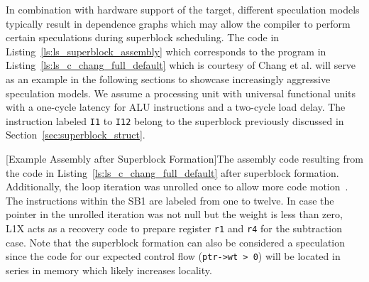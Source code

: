  In combination with hardware support of the target, different speculation models typically result in dependence graphs which may allow the compiler to perform certain speculations during superblock scheduling. The code in Listing~\ref{ls:ls_superblock_assembly} which corresponds to the program in Listing~\ref{ls:ls_c_chang_full_default} which is courtesy of Chang et al. will serve as an example in the following sections to showcase increasingly aggressive speculation models. We assume a processing unit with universal functional units with a one-cycle latency for ALU instructions and a two-cycle load delay. The instruction labeled \texttt{I1} to \texttt{I12} belong to the superblock previously discussed in Section~\ref{sec:superblock_struct}.
\begin{center}
        
        \captionsetup{type=Listing}
        [Example Assembly after Superblock Formation]{The assembly code resulting from the code in Listing~\ref{ls:ls_c_chang_full_default} after superblock formation. Additionally, the loop iteration was unrolled once to allow more code motion~\cite{chang95}. The instructions within the SB1 are labeled from one to twelve. In case the pointer in the unrolled iteration was not null but the weight is less than zero, L1X acts as a recovery code to prepare register \texttt{r1} and \texttt{r4} for the subtraction case. Note that the superblock formation can also be considered a speculation since the code for our expected control flow (\texttt{ptr->wt > 0}) will be located in series in memory which likely increases locality.}
        \label{ls:ls_superblock_assembly}
\end{center}

